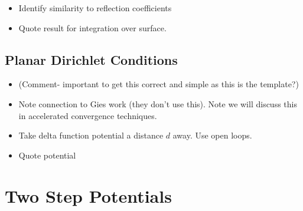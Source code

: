 \begin{itemize}
  \item Identify similarity to reflection coefficients
  \item {Quote result for integration over surface.}


\end{itemize}

\subsection{Planar Dirichlet Conditions}

\begin{itemize}
  \item (Comment- important to get this correct and simple as this is the template?)
  \item Note connection to Gies work (they don't use this).    Note we will discuss this in
    accelerated convergence techniques.  
  \item Take delta function potential a distance $d$ away.  Use open loops.  
  \item Quote potential
\end{itemize}

\section{Two Step Potentials}

